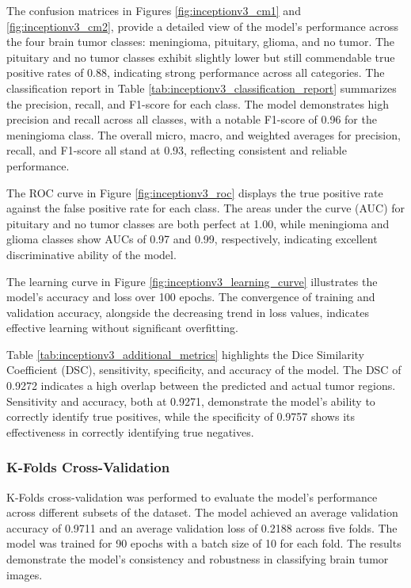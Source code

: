 The confusion matrices in Figures \ref{fig:inceptionv3_cm1} and \ref{fig:inceptionv3_cm2}, provide a detailed view of the model's performance across the four brain tumor classes: meningioma, pituitary, glioma, and no tumor. The pituitary and no tumor classes exhibit slightly lower but still commendable true positive rates of 0.88, indicating strong performance across all categories. The classification report in Table \ref{tab:inceptionv3_classification_report} summarizes the precision, recall, and F1-score for each class. The model demonstrates high precision and recall across all classes, with a notable F1-score of 0.96 for the meningioma class. The overall micro, macro, and weighted averages for precision, recall, and F1-score all stand at 0.93, reflecting consistent and reliable performance.

The ROC curve in Figure \ref{fig:inceptionv3_roc} displays the true positive rate against the false positive rate for each class. The areas under the curve (AUC) for pituitary and no tumor classes are both perfect at 1.00, while meningioma and glioma classes show AUCs of 0.97 and 0.99, respectively, indicating excellent discriminative ability of the model.

The learning curve in Figure \ref{fig:inceptionv3_learning_curve} illustrates the model's accuracy and loss over 100 epochs. The convergence of training and validation accuracy, alongside the decreasing trend in loss values, indicates effective learning without significant overfitting.

Table \ref{tab:inceptionv3_additional_metrics} highlights the Dice Similarity Coefficient (DSC), sensitivity, specificity, and accuracy of the model. The DSC of 0.9272 indicates a high overlap between the predicted and actual tumor regions. Sensitivity and accuracy, both at 0.9271, demonstrate the model's ability to correctly identify true positives, while the specificity of 0.9757 shows its effectiveness in correctly identifying true negatives.

\subsubsection{K-Folds Cross-Validation}

K-Folds cross-validation was performed to evaluate the model's performance across different subsets of the dataset. The model achieved an average validation accuracy of 0.9711 and an average validation loss of 0.2188 across five folds. The model was trained for 90 epochs with a batch size of 10 for each fold. The results demonstrate the model's consistency and robustness in classifying brain tumor images.

